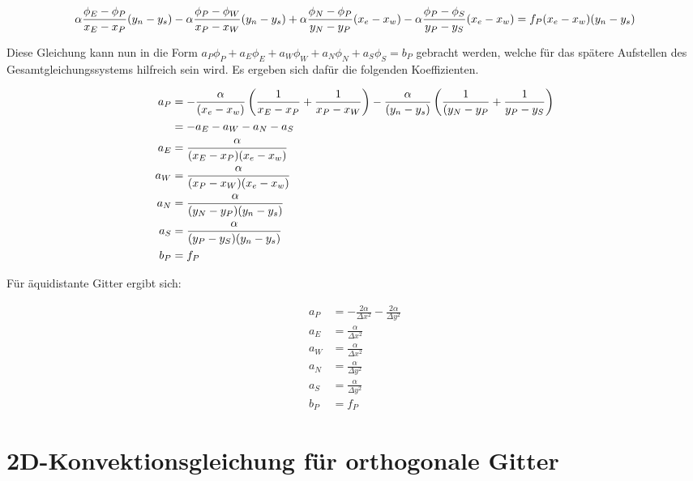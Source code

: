 \documentclass[10pt, ngerman,colorback,accentcolor=tud2d]{tudreport}
\begin{document}
\begin{equation*}
  \alpha \frac{\phi_E-\phi_P}{x_E-x_P} (y_n-y_s) -
  \alpha \frac{\phi_P-\phi_W}{x_P-x_W} (y_n-y_s) +
  \alpha \frac{\phi_N-\phi_P}{y_N-y_P} (x_e-x_w) -
  \alpha \frac{\phi_P-\phi_S}{y_P-y_S} (x_e-x_w) =
  f_P (x_e-x_w) (y_n-y_s)
\end{equation*}

Diese Gleichung kann nun in die Form
$a_P\phi_P +a_E\phi_E +a_W\phi_W +a_N\phi_N +a_S\phi_S =b_P$
gebracht werden, welche für das spätere Aufstellen des Gesamtgleichungssystems
hilfreich sein wird. Es ergeben sich dafür die folgenden Koeffizienten.

\begin{align*}
  a_P &= -\frac{\alpha}{(x_e-x_w)} \left({\frac{1}{x_E-x_P} + \frac{1}{x_P-x_W}}\right)
  -\frac{\alpha}{(y_n-y_s)} \left({\frac{1}{(y_N-y_P} + \frac{1}{y_P-y_S}}\right)\\
  &= -a_E-a_W-a_N-a_S\\
  a_E &= \frac{\alpha}{(x_E-x_P)(x_e-x_w)} \\
  a_W &= \frac{\alpha}{(x_P-x_W)(x_e-x_w)} \\
  a_N &= \frac{\alpha}{(y_N-y_P)(y_n-y_s)} \\
  a_S &= \frac{\alpha}{(y_P-y_S)(y_n-y_s)} \\
  b_P &=f_P
\end{align*}

Für äquidistante Gitter ergibt sich:

\begin{align*}
  a_P &= -\frac{2 \alpha}{\Delta x^2} -\frac{2 \alpha}{\Delta y^2}\\
  a_E &= \frac{\alpha}{\Delta x^2} \\
  a_W &= \frac{\alpha}{\Delta x^2} \\
  a_N &= \frac{\alpha}{\Delta y^2} \\
  a_S &= \frac{\alpha}{\Delta y^2} \\
  b_P &=f_P
\end{align*}



\chapter{2D-Konvektionsgleichung für orthogonale Gitter}
\end{document}
